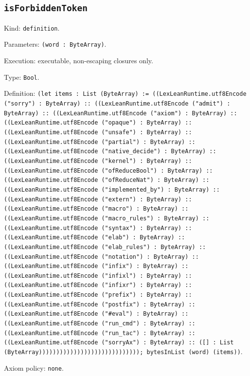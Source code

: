 \documentclass[11pt]{article}
\begin{document}
\subsection*{\texttt{isForbiddenToken}}
\noindent Kind: \texttt{definition}.\par
\noindent Parameters: \texttt{(word : ByteArray)}.\par
\noindent Execution: executable, non-escaping closures only.\par
\noindent Type: \texttt{Bool}.\par
\noindent Definition: \texttt{(let items : List (ByteArray) := ((LexLeanRuntime.utf8Encode ("sorry") : ByteArray) :: ((LexLeanRuntime.utf8Encode ("admit") : ByteArray) :: ((LexLeanRuntime.utf8Encode ("axiom") : ByteArray) :: ((LexLeanRuntime.utf8Encode ("opaque") : ByteArray) :: ((LexLeanRuntime.utf8Encode ("unsafe") : ByteArray) :: ((LexLeanRuntime.utf8Encode ("partial") : ByteArray) :: ((LexLeanRuntime.utf8Encode ("native\_decide") : ByteArray) :: ((LexLeanRuntime.utf8Encode ("kernel") : ByteArray) :: ((LexLeanRuntime.utf8Encode ("ofReduceBool") : ByteArray) :: ((LexLeanRuntime.utf8Encode ("ofReduceNat") : ByteArray) :: ((LexLeanRuntime.utf8Encode ("implemented\_by") : ByteArray) :: ((LexLeanRuntime.utf8Encode ("extern") : ByteArray) :: ((LexLeanRuntime.utf8Encode ("macro") : ByteArray) :: ((LexLeanRuntime.utf8Encode ("macro\_rules") : ByteArray) :: ((LexLeanRuntime.utf8Encode ("syntax") : ByteArray) :: ((LexLeanRuntime.utf8Encode ("elab") : ByteArray) :: ((LexLeanRuntime.utf8Encode ("elab\_rules") : ByteArray) :: ((LexLeanRuntime.utf8Encode ("notation") : ByteArray) :: ((LexLeanRuntime.utf8Encode ("infix") : ByteArray) :: ((LexLeanRuntime.utf8Encode ("infixl") : ByteArray) :: ((LexLeanRuntime.utf8Encode ("infixr") : ByteArray) :: ((LexLeanRuntime.utf8Encode ("prefix") : ByteArray) :: ((LexLeanRuntime.utf8Encode ("postfix") : ByteArray) :: ((LexLeanRuntime.utf8Encode ("\#eval") : ByteArray) :: ((LexLeanRuntime.utf8Encode ("run\_cmd") : ByteArray) :: ((LexLeanRuntime.utf8Encode ("run\_tac") : ByteArray) :: ((LexLeanRuntime.utf8Encode ("sorryAx") : ByteArray) :: ([] : List (ByteArray))))))))))))))))))))))))))))); bytesInList (word) (items))}.\par
\noindent Axiom policy: \texttt{none}.\par
\end{document}
